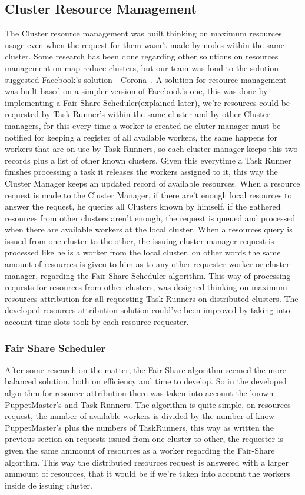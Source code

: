 \documentclass[times, 10pt,twocolumn]{article}
\begin{document}
    	\subsection{Cluster Resource Management}
      The Cluster resource management was built thinking on maximum resources usage even when the request for them wasn't made by nodes within the same cluster. Some research
      has been done regarding other solutions on resources management on map reduce clusters, but our team was fond to the solution suggested Facebook's solution—Corona~\cite{ChingFacebook2012}.
      A solution for resource management was built based on a simpler version of Facebook's one, this was done by implementing a Fair Share Scheduler(explained later), we're resources could be requested by
      Task Runner's within the same cluster and by other Cluster managers, for this every time a worker is created ne cluter manager must be notified for keeping a register
      of all available workers, the same happens for workers that are on use by Task Runners, so each cluster manager keeps this two records plus a list of other known clusters.
      Given this everytime a Task Runner finishes processing a task it releases the workers assigned to it, this way the Cluster Manager keeps an updated record of available resources.
      When a resource request is made to the Cluster Manager, if there are't enough local resources to answer the request, he queries all Clusters known by himself,
      if the gathered resources from other clusters aren't enough, the request is queued and processed when there are available workers at the local cluster.
      When a resources query is issued from one cluster to the other, the issuing cluster manager request is processed like he is a worker from the local cluster,
      on other words the same amount of resources is given to him as to any other requester worker or cluster manager, regarding the Fair-Share Scheduler algorithm.
      This way of processing requests for resources from other clusters, was designed thinking on maximum resources attribution for all requesting Task Runners on
      distributed clusters. The developed resources attribution solution could've been improved by taking into account time slots took by each resource requester.

      \subsubsection{Fair Share Scheduler}
      After some research on the matter, the Fair-Share algorithm seemed the more balanced solution, both on efficiency and time to develop. So in the developed algorithm
      for resource attribution there was taken into account the known PuppetMaster's and Task Runners. The algorithm is quite simple, on resources request, the number of
      available workers is divided by the number of know PuppetMaster's plus the numbers of TaskRunners, this way as written the previous section on requests issued from
      one cluster to other, the requester is given the same ammount of resources as a worker regarding the Fair-Share algorthm. This way the distributed resources request
      is answered with a larger ammount of resources, that it would be if we're taken into account the workers inside de issuing cluster.
\end{document}

